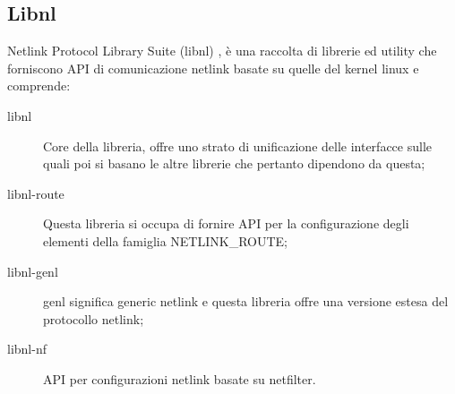 \subsection{Libnl}
Netlink Protocol Library Suite (libnl) \cite{K10}, \`e una raccolta di librerie ed utility che forniscono API di comunicazione netlink basate su quelle del kernel linux e comprende:
\begin{description}                     %
  \item[libnl] Core della libreria, offre uno strato di unificazione delle interfacce sulle quali poi si basano le altre librerie che pertanto dipendono da questa;
  \item[libnl-route] Questa libreria si occupa di fornire API per la configurazione degli elementi della famiglia NETLINK\_ROUTE;
  \item[libnl-genl] genl significa generic netlink e questa libreria offre una versione estesa del protocollo netlink;
  \item[libnl-nf] API per configurazioni netlink basate su netfilter.

\end{description}

\clearpage{\pagestyle{empty}\cleardoublepage}
